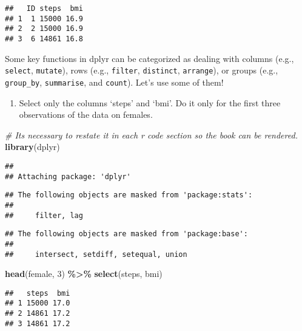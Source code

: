 \documentclass[
]{book}
\newenvironment{Shaded}{\begin{snugshade}}{\end{snugshade}}
\newcommand{\CommentTok}[1]{\textcolor[rgb]{0.56,0.35,0.01}{\textit{#1}}}
\newcommand{\DecValTok}[1]{\textcolor[rgb]{0.00,0.00,0.81}{#1}}
\newcommand{\FunctionTok}[1]{\textcolor[rgb]{0.13,0.29,0.53}{\textbf{#1}}}
\newcommand{\NormalTok}[1]{#1}
\newcommand{\SpecialCharTok}[1]{\textcolor[rgb]{0.81,0.36,0.00}{\textbf{#1}}}
\providecommand{\tightlist}{%
  \setlength{\itemsep}{0pt}\setlength{\parskip}{0pt}}
\begin{document}
\begin{verbatim}
##   ID steps  bmi
## 1  1 15000 16.9
## 2  2 15000 16.9
## 3  6 14861 16.8
\end{verbatim}

Some key functions in dplyr can be categorized as dealing with columns (e.g., \texttt{select}, \texttt{mutate}), rows (e.g., \texttt{filter}, \texttt{distinct}, \texttt{arrange}), or groups (e.g., \texttt{group\_by}, \texttt{summarise}, and \texttt{count}). Let's use some of them!

\begin{enumerate}
\def\labelenumi{\arabic{enumi}.}
\setcounter{enumi}{1}
\tightlist
\item
  Select only the columns `steps' and `bmi'. Do it only for the first three observations of the data on females.
\end{enumerate}

\begin{Shaded}
\begin{Highlighting}[]
\CommentTok{\# It\textquotesingle{}s necessary to restate it in each r code section so the book can be rendered.}
\FunctionTok{library}\NormalTok{(dplyr)}
\end{Highlighting}
\end{Shaded}

\begin{verbatim}
## 
## Attaching package: 'dplyr'
\end{verbatim}

\begin{verbatim}
## The following objects are masked from 'package:stats':
## 
##     filter, lag
\end{verbatim}

\begin{verbatim}
## The following objects are masked from 'package:base':
## 
##     intersect, setdiff, setequal, union
\end{verbatim}

\begin{Shaded}
\begin{Highlighting}[]
\FunctionTok{head}\NormalTok{(female, }\DecValTok{3}\NormalTok{) }\SpecialCharTok{\%\textgreater{}\%}
  \FunctionTok{select}\NormalTok{(steps, bmi)}
\end{Highlighting}
\end{Shaded}

\begin{verbatim}
##   steps  bmi
## 1 15000 17.0
## 2 14861 17.2
## 3 14861 17.2
\end{verbatim}
\end{document}
